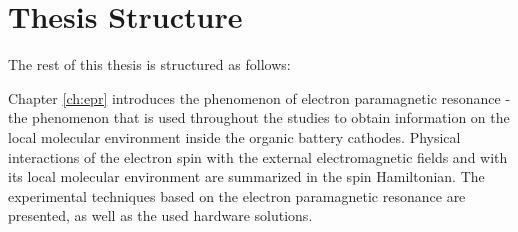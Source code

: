\section{Thesis Structure}

The rest of this thesis is structured as follows:\\ 
\par
Chapter \ref{ch:epr} introduces the phenomenon of electron paramagnetic resonance - the phenomenon that is used throughout the studies to obtain information on the local molecular environment inside the organic battery cathodes. Physical interactions of the electron spin with the external electromagnetic fields and with its local molecular environment are summarized in the spin Hamiltonian. The experimental techniques based on the electron paramagnetic resonance are presented, as well as the used hardware solutions.




